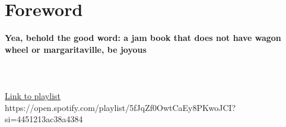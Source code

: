 \section*{Foreword}
{\bf Yea, behold the good word: a jam book that does not have wagon wheel or
margaritaville, be joyous}\\
\\
\\
\\
\href{https://open.spotify.com/playlist/5fJqZf0OwtCaEy8PKwoJCI?si=4451213ac38a4384}{Link
to playlist}\\
https://open.spotify.com/playlist/5fJqZf0OwtCaEy8PKwoJCI?si=4451213ac38a4384
